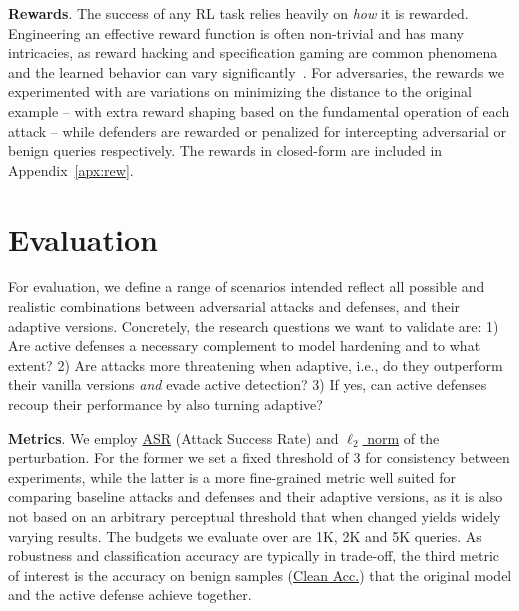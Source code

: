\textbf{Rewards}. The success of any \gls{RL} task relies heavily on \emph{how} it is rewarded.
Engineering an effective reward function is often non-trivial and has many intricacies, as reward hacking and specification gaming are common phenomena and the learned behavior can vary significantly~\cite{amodei2016concrete}.
For adversaries, the rewards we experimented with are variations on minimizing the distance to the original example -- with extra reward shaping based on the fundamental operation of each attack -- while defenders are rewarded or penalized for intercepting adversarial or benign queries respectively.
The rewards in closed-form are included in Appendix~\ref{apx:rew}.

\section{Evaluation}
\label{sec:evaluation}
For evaluation, we define a range of scenarios intended reflect all possible and realistic combinations between adversarial attacks and defenses, and their adaptive versions.
Concretely, the research questions we want to validate are: 1) Are active defenses a necessary complement to model hardening and to what extent? 2) Are attacks more threatening when adaptive, i.e., do they outperform their vanilla versions \textit{and} evade active detection? 3) If yes, can active defenses recoup their performance by also turning adaptive?

\textbf{Metrics}. We employ \underline{ASR} (Attack Success Rate) and \underline{$\ell_2$ norm} of the perturbation.
For the former we set a fixed threshold of 3 for consistency between experiments, while the latter is a more fine-grained metric well suited for comparing baseline attacks and defenses and their adaptive versions, as it is also not based on an arbitrary perceptual threshold that when changed yields widely varying results.
The budgets we evaluate over are 1K, 2K and 5K queries.
As robustness and classification accuracy are typically in trade-off, the third metric of interest is the accuracy on benign samples (\underline{Clean Acc.}) that the original model and the active defense achieve together.

